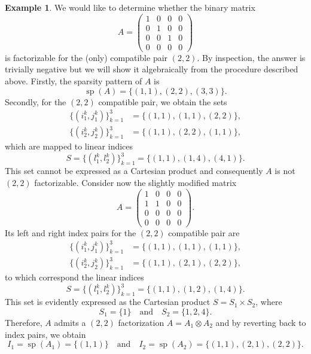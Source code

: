 \documentclass{article}
\numberwithin{equation}{section}
\DeclareMathOperator{\sparsity}{\operatorname{sp}}
\theoremstyle{definition}
\newtheorem{example}[definition]{Example}
\begin{document}
\begin{example}
We would like to determine whether the binary matrix
\begin{equation*}
    A =
    \begin{pmatrix}
        1 & 0 & 0 & 0 \\
        0 & 1 & 0 & 0 \\
        0 & 0 & 1 & 0 \\
        0 & 0 & 0 & 0
    \end{pmatrix}
\end{equation*}
is factorizable for the (only) compatible pair $(2,2)$. By inspection, the answer is trivially negative but we will show it algebraically from the procedure described above. Firstly, the sparsity pattern of $A$ is
\begin{equation*}
    \sparsity(A) = \{(1,1), (2,2), (3,3)\}.
\end{equation*}
Secondly, for the $(2,2)$ compatible pair, we obtain the sets
\begin{align*}
    \{(i_1^k,j_1^k)\}_{k=1}^3 &= \{(1,1),(1,1),(2,2)\}, \\
    \{(i_2^k,j_2^k)\}_{k=1}^3 &= \{(1,1),(2,2),(1,1)\},
\end{align*}
which are mapped to linear indices
\begin{equation*}
    S = \{(l_1^k,l_2^k)\}_{k=1}^3 = \{(1,1),(1,4),(4,1)\}.
\end{equation*}
This set cannot be expressed as a Cartesian product and consequently $A$ is not $(2,2)$ factorizable. Consider now the slightly modified matrix
\begin{equation*}
    A =
    \begin{pmatrix}
        1 & 0 & 0 & 0 \\
        1 & 1 & 0 & 0 \\
        0 & 0 & 0 & 0 \\
        0 & 0 & 0 & 0
    \end{pmatrix}.
\end{equation*}
Its left and right index pairs for the $(2,2)$ compatible pair are
\begin{align*}
    \{(i_1^k,j_1^k)\}_{k=1}^3 &= \{(1,1),(1,1),(1,1)\}, \\
    \{(i_2^k,j_2^k)\}_{k=1}^3 &= \{(1,1),(2,1),(2,2)\},
\end{align*}
to which correspond the linear indices
\begin{equation*}
    S = \{(l_1^k,l_2^k)\}_{k=1}^3 = \{(1,1),(1,2),(1,4)\}.
\end{equation*}
This set is evidently expressed as the Cartesian product $S = S_1 \times S_2$, where
\begin{equation*}
    S_1 = \{1\} \quad \text{and} \quad S_2 = \{1,2,4\}.
\end{equation*}
Therefore, $A$ admits a $(2,2)$ factorization $A=A_1 \otimes A_2$ and by reverting back to index pairs, we obtain
\begin{equation*}
    I_1=\sparsity(A_1) = \{(1,1)\} \quad \text{and} \quad I_2=\sparsity(A_2) = \{(1,1),(2,1),(2,2)\}.
\end{equation*}
\end{example}
\end{document}
